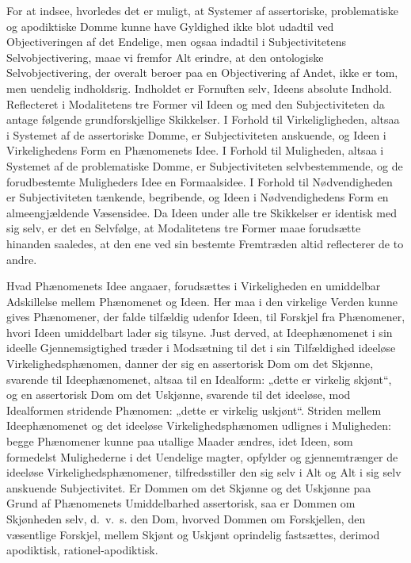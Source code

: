 \documentclass[12pt]{book}
\newcommand{\opage}[1]{\marginnote{\footnotesize\textit{[#1]}}}
\begin{document}
For at indsee, hvorledes det er muligt, at Systemer af
assertoriske, problematiske og apodiktiske Domme kunne have
Gyldighed ikke blot udadtil ved Objectiveringen af det Endelige,
men ogsaa indadtil i Subjectivitetens Selvobjectivering,
maae vi fremfor Alt erindre, at den ontologiske Selvobjectivering,
der overalt beroer paa en Objectivering af Andet, ikke
er tom, men uendelig indholdsrig. Indholdet er Fornuften
selv, Ideens absolute Indhold. Reflecteret i Modalitetens
tre Former vil Ideen og med den Subjectiviteten da antage
følgende grundforskjellige Skikkelser. I Forhold til Virkeligligheden,
altsaa i Systemet af de assertoriske Domme, er
Subjectiviteten anskuende, og Ideen i Virkelighedens Form en
Phænomenets Idee. I Forhold til Muligheden, altsaa i
Systemet af de problematiske Domme, er Subjectiviteten selvbestemmende,
og de forudbestemte Muligheders Idee en Formaalsidee.
I Forhold til Nødvendigheden er Subjectiviteten
tænkende, begribende, og Ideen i Nødvendighedens Form en
almeengjældende Væsensidee. Da Ideen under alle tre Skikkelser
er identisk med sig selv, er det en Selvfølge, at Modalitetens
tre Former maae forudsætte hinanden saaledes, at
den ene ved sin bestemte Fremtræden altid reflecterer de to
andre.

Hvad Phænomenets Idee angaaer, forudsættes i Virkeligheden
en umiddelbar Adskillelse mellem Phænomenet og
Ideen. Her maa i den virkelige Verden kunne gives Phænomener,
der falde tilfældig udenfor Ideen, til Forskjel fra
Phænomener, hvori Ideen umiddelbart lader sig tilsyne. Just
derved, at Ideephænomenet i sin ideelle Gjennemsigtighed træder
i Modsætning til det i sin Tilfældighed ideeløse Virkelighedsphænomen,
danner der sig en assertorisk Dom om det Skjønne,
svarende til Ideephænomenet, altsaa til en Idealform: „dette
er virkelig skjønt“, og en assertorisk Dom om det Uskjønne,
\opage{280}svarende til det ideeløse, mod Idealformen stridende Phænomen:
„dette er virkelig uskjønt“. Striden mellem Ideephænomenet
og det ideeløse Virkelighedsphænomen udlignes i Muligheden:
begge Phænomener kunne paa utallige Maader ændres,
idet Ideen, som formedelst Mulighederne i det Uendelige
magter, opfylder og gjennemtrænger de ideeløse Virkelighedsphænomener,
tilfredsstiller den sig selv i Alt og Alt i sig selv
anskuende Subjectivitet. Er Dommen om det Skjønne og
det Uskjønne paa Grund af Phænomenets Umiddelbarhed
assertorisk, saa er Dommen om Skjønheden selv, d.\ v.\ s. den
Dom, hvorved Dommen om Forskjellen, den væsentlige Forskjel,
mellem Skjønt og Uskjønt oprindelig fastsættes, derimod
apodiktisk, rationel-apodiktisk.
\end{document}
